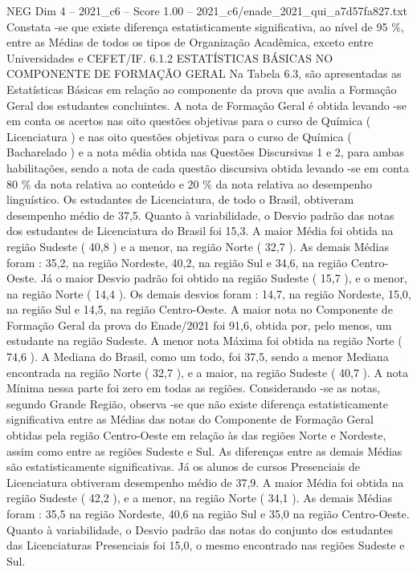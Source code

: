 \begin{textsample}{NEG Dim 4 – 2021\_c6 – Score 1.00 – 2021\_c6/enade\_2021\_qui\_a7d57fa827.txt}
Constata -se que existe diferença estatisticamente significativa, ao nível de 95 \%, entre as Médias de todos os tipos de Organização Acadêmica, exceto entre Universidades e CEFET/IF. 6.1.2 ESTATÍSTICAS BÁSICAS NO COMPONENTE DE FORMAÇÃO GERAL Na Tabela 6.3, são apresentadas as Estatísticas Básicas em relação ao componente da prova que avalia a Formação Geral dos estudantes concluintes.
A nota de Formação Geral é obtida levando -se em conta os acertos nas oito questões objetivas para o curso de Química ( Licenciatura ) e nas oito questões objetivas para o curso de Química ( Bacharelado ) e a nota média obtida nas Questões Discursivas 1 e 2, para ambas habilitações, sendo a nota de cada questão discursiva obtida levando -se em conta 80 \% da nota relativa ao conteúdo e 20 \% da nota relativa ao desempenho linguístico.
Os estudantes de Licenciatura, de todo o Brasil, obtiveram desempenho médio de 37,5.
Quanto à variabilidade, o Desvio padrão das notas dos estudantes de Licenciatura do Brasil foi 15,3.
A maior Média foi obtida na região Sudeste ( 40,8 ) e a menor, na região Norte ( 32,7 ).
As demais Médias foram : 35,2, na região Nordeste, 40,2, na região Sul e 34,6, na região Centro-Oeste.
Já o maior Desvio padrão foi obtido na região Sudeste ( 15,7 ), e o menor, na região Norte ( 14,4 ).
Os demais desvios foram : 14,7, na região Nordeste, 15,0, na região Sul e 14,5, na região Centro-Oeste.
A maior nota no Componente de Formação Geral da prova do Enade/2021 foi 91,6, obtida por, pelo menos, um estudante na região Sudeste.
A menor nota Máxima foi obtida na região Norte ( 74,6 ).
A Mediana do Brasil, como um todo, foi 37,5, sendo a menor Mediana encontrada na região Norte ( 32,7 ), e a maior, na região Sudeste ( 40,7 ).
A nota Mínima nessa parte foi zero em todas as regiões.
Considerando -se as notas, segundo Grande Região, observa -se que não existe diferença estatisticamente significativa entre as Médias das notas do Componente de Formação Geral obtidas pela região Centro-Oeste em relação às das regiões Norte e Nordeste, assim como entre as regiões Sudeste e Sul.
As diferenças entre as demais Médias são estatisticamente significativas.
Já os alunos de cursos Presenciais de Licenciatura obtiveram desempenho médio de 37,9.
A maior Média foi obtida na região Sudeste ( 42,2 ), e a menor, na região Norte ( 34,1 ).
As demais Médias foram : 35,5 na região Nordeste, 40,6 na região Sul e 35,0 na região Centro-Oeste.
Quanto à variabilidade, o Desvio padrão das notas do conjunto dos estudantes das Licenciaturas Presenciais foi 15,0, o mesmo encontrado nas regiões Sudeste e Sul.

\end{textsample}
